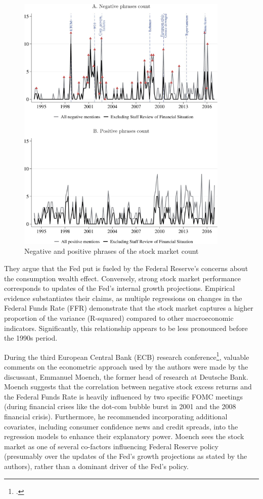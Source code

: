 \begin{figure}[h]
    \centering
        \label{cies21_fig5}
    \includegraphics[width=0.9\textwidth]{figures/cies21/Figure5}
    \caption{Negative and positive phrases of the stock market count \parencite{cieslak_economics_2021}}
\end{figure}

They argue that the Fed put is fueled by the Federal Reserve's concerns about the consumption wealth effect. Conversely, strong stock market performance corresponds to updates of the Fed’s internal growth projections. Empirical evidence substantiates their claims, as multiple regressions on changes in the Federal Funds Rate (FFR) demonstrate that the stock market captures a higher proportion of the variance (R-squared) compared to other macroeconomic indicators. Significantly, this relationship appears to be less pronounced before the 1990s period.  

During the third European Central Bank (ECB) research conference\footcite{european_central_bank_third_2018}, valuable comments on the econometric approach used by the authors were made by the discussant, Emmanuel Moench, the former head of research at Deutsche Bank. Moench suggests that the correlation between negative stock excess returns and the Federal Funds Rate is heavily influenced by two specific FOMC meetings (during financial crises like the dot-com bubble burst in 2001 and the 2008 financial crisis). Furthermore, he recommended incorporating additional covariates, including consumer confidence news and credit spreads, into the regression models to enhance their explanatory power. Moench sees the stock market as one of several co-factors influencing Federal Reserve policy (presumably over the updates of the Fed's growth projections as stated by the authors), rather than a dominant driver of the Fed's policy.

